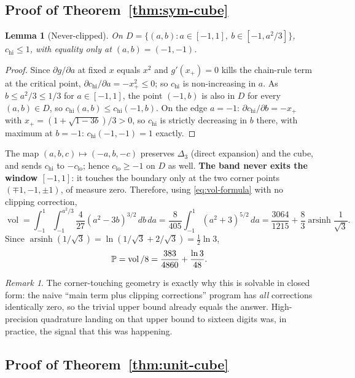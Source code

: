 \documentclass[11pt,reqno]{amsart}
\theoremstyle{plain}
\newtheorem{lemma}[theorem]{Lemma}
\theoremstyle{remark}
\newtheorem{remark}[theorem]{Remark}
\DeclareMathOperator{\vol}{vol}
\newcommand{\Prb}{\mathbb{P}}
\newcommand{\disc}{\Delta}
\begin{document}
\subsection{Proof of Theorem~\ref{thm:sym-cube}}

\begin{lemma}[Never-clipped] \label{lem:never-clipped}
On $D=\{(a,b): a\in[-1,1],\ b\in[-1,a^2/3]\}$, $c_{\mathrm{hi}}\le 1$, with
equality only at $(a,b)=(-1,-1)$.
\end{lemma}

\begin{proof}
Since $\partial g/\partial a$ at fixed $x$ equals $x^2$ and $g'(x_+)=0$ kills
the chain-rule term at the critical point, $\partial c_{\mathrm{hi}}/\partial a
= -x_+^2\le0$; so $c_{\mathrm{hi}}$ is non-increasing in $a$. As
$b\le a^2/3\le 1/3$ for $a\in[-1,1]$, the point $(-1,b)$ is also in $D$ for
every $(a,b)\in D$, so $c_{\mathrm{hi}}(a,b)\le c_{\mathrm{hi}}(-1,b)$. On the
edge $a=-1$: $\partial c_{\mathrm{hi}}/\partial b=-x_+$ with
$x_+=(1+\sqrt{1-3b})/3>0$, so $c_{\mathrm{hi}}$ is strictly decreasing in $b$
there, with maximum at $b=-1$: $c_{\mathrm{hi}}(-1,-1)=1$ exactly.
\end{proof}

The map $(a,b,c)\mapsto(-a,b,-c)$ preserves $\disc_3$ (direct expansion) and
the cube, and sends $c_{\mathrm{hi}}$ to $-c_{\mathrm{lo}}$; hence
$c_{\mathrm{lo}}\ge-1$ on $D$ as well. \textbf{The band never exits the window
$[-1,1]$}: it touches the boundary only at the two corner points
$(\mp1,-1,\pm1)$, of measure zero. Therefore, using
\eqref{eq:vol-formula} with no clipping correction,
\[
  \vol = \int_{-1}^{1}\int_{-1}^{a^2/3}\frac{4}{27}(a^2-3b)^{3/2}\,db\,da
       = \frac{8}{405}\int_{-1}^{1}(a^2+3)^{5/2}\,da
       = \frac{3064}{1215}+\frac{8}{3}\operatorname{arsinh}\!\frac{1}{\sqrt3}.
\]
Since $\operatorname{arsinh}(1/\sqrt3)=\ln(1/\sqrt3+2/\sqrt3)=\tfrac12\ln 3$,
\[
  \Prb = \vol/8 = \frac{383}{4860}+\frac{\ln 3}{48}. \qedhere
\]

\begin{remark}
The corner-touching geometry is exactly why this is solvable in closed form:
the naive ``main term plus clipping corrections'' program has \emph{all}
corrections identically zero, so the trivial upper bound already equals the
answer. High-precision quadrature landing on that upper bound to sixteen
digits was, in practice, the signal that this was happening.
\end{remark}

\subsection{Proof of Theorem~\ref{thm:unit-cube}}
\end{document}
